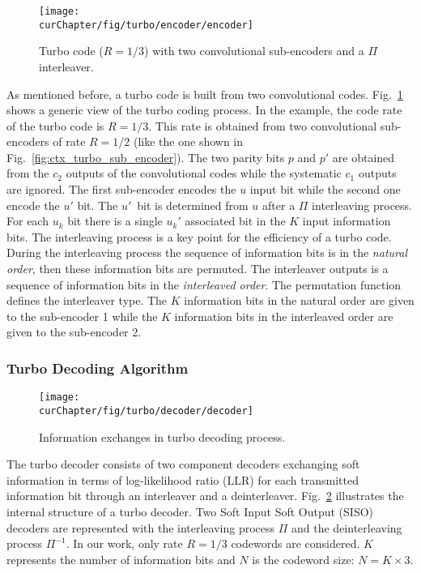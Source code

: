 \begin{figure}[htp]
  \centering
  \texttt{[image: \\curChapter/fig/turbo/encoder/encoder]}
  \caption{Turbo code ($R = 1/3$) with two convolutional sub-encoders and a
    $\Pi$ interleaver.}
  \label{fig:ctx_turbo_encoder}
\end{figure}

As mentioned before, a turbo code is built from two convolutional codes.
Fig.~\ref{fig:ctx_turbo_encoder} shows a generic view of the turbo coding
process. In the example, the code rate of the turbo code is $R = 1/3$. This rate
is obtained from two convolutional sub-encoders of rate $R = 1/2$ (like the one
shown in Fig.~\ref{fig:ctx_turbo_sub_encoder}). The two parity bits $p$ and $p'$
are obtained from the $c_2$ outputs of the convolutional codes while the
systematic $c_1$ outputs are ignored. The first sub-encoder encodes the $u$
input bit while the second one encode the $u'$ bit. The $u'$~bit is determined
from $u$ after a $\Pi$ interleaving process. For each $u_k$ bit there is a
single $u_k'$ associated bit in the $K$ input information bits. The interleaving
process is a key point for the efficiency of a turbo code.
During the interleaving process the sequence of information bits is in the
\emph{natural order}, then these information bits are permuted. The interleaver
outputs is a sequence of information bits in the \emph{interleaved order}. The
permutation function defines the interleaver type. The $K$ information bits in
the natural order are given to the sub-encoder 1 while the $K$ information bits
in the interleaved order are given to the sub-encoder 2.

\subsubsection{Turbo Decoding Algorithm}
\label{sec:turbo_overview}

\begin{figure}[htp]
  \centering
  \texttt{[image: \\curChapter/fig/turbo/decoder/decoder]}
  \caption{Information exchanges in turbo decoding process.}
  \label{fig:ctx_turbo_decoder}
\end{figure}

The turbo decoder consists of two component decoders exchanging soft information
in terms of log-likelihood ratio (LLR) for each transmitted information bit
through an interleaver and a deinterleaver. Fig.~\ref{fig:ctx_turbo_decoder}
illustrates the internal structure of a turbo decoder. Two Soft Input Soft
Output (SISO) decoders are represented with the interleaving process $\Pi$ and
the deinterleaving process $\Pi^{-1}$. In our work, only rate $R = 1/3$
codewords are considered. $K$ represents the number of information bits and $N$
is the codeword size: $N = K \times 3$.

